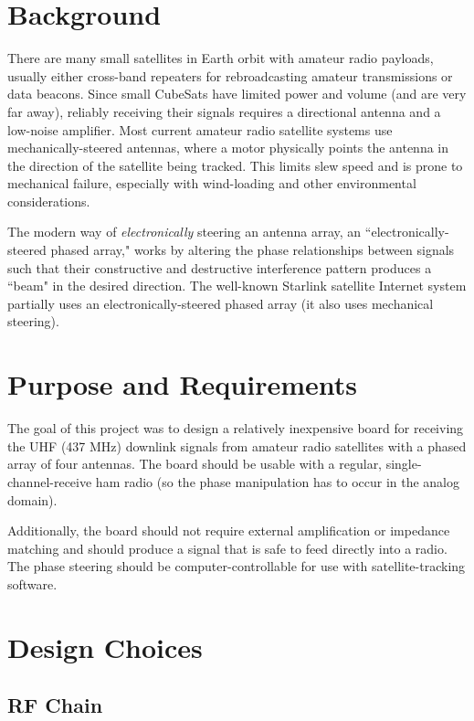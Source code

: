 \documentclass[fleqn]{article}
\begin{document}
\section{Background}

There are many small satellites in Earth orbit with amateur radio payloads, usually either cross-band repeaters for rebroadcasting amateur transmissions or data beacons. Since small CubeSats have limited power and volume (and are very far away), reliably receiving their signals requires a directional antenna and a low-noise amplifier. Most current amateur radio satellite systems use mechanically-steered antennas, where a motor physically points the antenna in the direction of the satellite being tracked. This limits slew speed and is prone to mechanical failure, especially with wind-loading and other environmental considerations.

The modern way of \emph{electronically} steering an antenna array, an ``electronically-steered phased array," works by altering the phase relationships between signals such that their constructive and destructive interference pattern produces a ``beam" in the desired direction. The well-known Starlink satellite Internet system partially uses an electronically-steered phased array (it also uses mechanical steering).

\section{Purpose and Requirements}

The goal of this project was to design a relatively inexpensive board for receiving the UHF (437 MHz) downlink signals from amateur radio satellites with a phased array of four antennas. The board should be usable with a regular, single-channel-receive ham radio (so the phase manipulation has to occur in the analog domain).

Additionally, the board should not require external amplification or impedance matching and should produce a signal that is safe to feed directly into a radio. The phase steering should be computer-controllable for use with satellite-tracking software.

\section{Design Choices}

\subsection{RF Chain}
\end{document}
